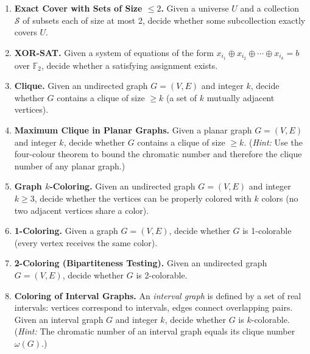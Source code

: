 \documentclass[9pt]{book}
\begin{document}
\begin{enumerate}[label=\arabic*.]
\bigskip

\item \textbf{Exact Cover with Sets of Size $\leq 2$.}
Given a universe $U$ and a collection $\mathcal{S}$ of subsets each of 
size at most 2, decide whether some subcollection exactly covers $U$.

\bigskip

\item \textbf{XOR-SAT.}
Given a system of equations of the form 
$x_{i_1}\oplus x_{i_2}\oplus\cdots\oplus x_{i_k}=b$ over $\mathbb{F}_2$, 
decide whether a satisfying assignment exists.

\bigskip

\item \textbf{Clique.}
Given an undirected graph $G=(V,E)$ and integer $k$, decide whether $G$ contains a 
clique of size $\geq k$ (a set of $k$ mutually adjacent vertices).

\bigskip

\item \textbf{Maximum Clique in Planar Graphs.}
Given a planar graph $G=(V,E)$ and integer $k$, decide whether $G$ contains a clique of 
size $\geq k$.
(\textit{Hint:} Use the four-colour theorem to bound the chromatic number and therefore 
the clique number of any planar graph.)

\bigskip

\item \textbf{Graph $k$-Coloring.}
Given an undirected graph $G=(V,E)$ and integer $k\geq 3$, decide whether the vertices 
can be properly colored with $k$ colors (no two adjacent vertices share a color).

\bigskip

\item \textbf{1-Coloring.}
Given a graph $G=(V,E)$, decide whether $G$ is 1-colorable (every vertex receives the 
same color).

\bigskip

\item \textbf{2-Coloring (Bipartiteness Testing).}
Given an undirected graph $G=(V,E)$, decide whether $G$ is 2-colorable.

\bigskip

\item \textbf{Coloring of Interval Graphs.}
An \emph{interval graph} is defined by a set of real intervals: vertices correspond to intervals, edges connect overlapping pairs.
Given an interval graph $G$ and integer $k$, decide whether $G$ is $k$-colorable.
(\textit{Hint:} The chromatic number of an interval graph equals its clique number $\omega(G)$.)


\end{enumerate}
\end{document}
